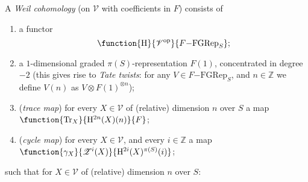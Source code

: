 \documentclass[a4paper,10pt]{article}
\def\basepieces{\mathscr{V}}
\newcommand{\fgrep}[2]{#1\mathrm{-FGRep}_{#2}}
\def\coh{\mathrm{H}}
\def\tensor{\otimes}
\def\cyc{\mathscr{Z}}
\def\Tr{\mathrm{Tr}}
\begin{document}
A \emph{Weil cohomology} (on $\basepieces$ with coefficients in $F$) consists
of
\begin{enumerate}[label=(D\arabic*)] %
	\item a functor
		\[
			\function{\coh}%
			{\basepieces^{\mathrm{op}}}%
			{\fgrep{F}{S}};
		\]
	\item a $1$-dimensional graded $\pi(S)$-representation $F(1)$,
		concentrated in degree $-2$ (this gives rise to \emph{Tate
		twists}: for any $V \in \fgrep{F}{S}$, and $n \in \mathbb{Z}$
		we define $V(n)$ as $V \tensor F(1)^{\tensor n}$);
	\item (\emph{trace map}) for every $X \in \basepieces$ of (relative)
		dimension $n$ over $S$ a map
		$\function{\Tr_{X}}{\coh^{2n}(X)(n)}{F}$;
	\item (\emph{cycle map}) for every $X \in \basepieces$, and every $i
		\in \mathbb{Z}$ a map
		$\function{\gamma_{X}}%
		{\cyc^{i}(X)}{\coh^{2i}(X)^{\pi(S)}(i)}$;
\end{enumerate} %
such that for $X \in \basepieces$ of (relative) dimension $n$ over $S$:
\end{document}
